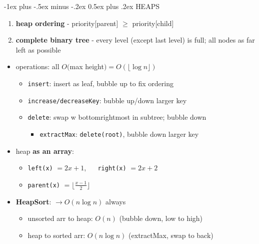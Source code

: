 \documentclass[10pt]{article}
\makeatletter
\renewcommand{\section}{\@startsection{section}{1}{0mm}%
                                {-1ex plus -.5ex minus -.2ex}%
                                {0.5ex plus .2ex}%
                                {\normalfont\large\bfseries}}
\newcommand{\floor}[1]{\lfloor #1 \rfloor}
\let\then\rightarrow
\newcommand{\code}[1]{\textcolor{mygreen}{\texttt{#1}}}
\makeatother
\begin{document}
\begin{multicols}{3}
\section{HEAPS}
\begin{enumerate}
    \item \textbf{heap ordering} - priority[parent] $\geq$ priority[child]
    \item \textbf{complete binary tree} - every level (except last level) is full; all nodes as far left as possible
\end{enumerate}
\begin{itemize}
    \item operations: all $O($max height$) = O(\floor{\log n})$
    \begin{itemize}
        \item \code{insert}: insert as leaf, bubble up to fix ordering
        \item \code{increase/decreaseKey}: bubble up/down larger key
        \item \code{delete}: swap w bottomrightmost in subtree; bubble down
        \begin{itemize}
            \item \code{extractMax}: \code{delete(root)}, bubble down larger key
        \end{itemize} 
    \end{itemize}
    \item heap \textbf{as an array}:
    \begin{itemize}
        \item \code{left(x)} $= 2x + 1$, $\quad$ \code{right(x)} $= 2x + 2$
        \item \code{parent(x)} $= \floor{\frac{x-1}{2}}$
    \end{itemize}
    \item \textbf{HeapSort}: $\then O(n \log n)$ always
    \begin{itemize}
        \item unsorted arr to heap: $O(n)$ (bubble down, low to high)
        \item heap to sorted arr: $O(n \log n)$ (extractMax, swap to back)
    \end{itemize}
\end{itemize}


\end{multicols}
\end{document}
